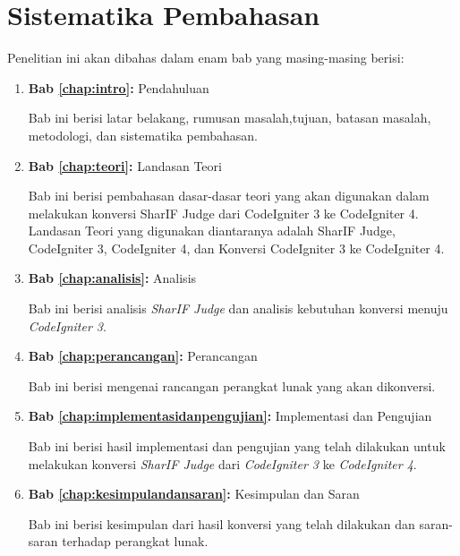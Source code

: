 \section{Sistematika Pembahasan}
\label{sec:sispem}
Penelitian ini akan dibahas dalam enam bab yang masing-masing berisi:
\begin{enumerate}
	\item \textbf{Bab \ref{chap:intro}:} Pendahuluan
	
	Bab ini berisi latar belakang, rumusan masalah,tujuan, batasan masalah, metodologi, dan sistematika pembahasan.
	\item \textbf{Bab \ref{chap:teori}:} Landasan Teori
	
	Bab ini berisi pembahasan dasar-dasar teori yang akan digunakan dalam melakukan konversi SharIF Judge dari CodeIgniter 3 ke CodeIgniter 4. Landasan Teori yang digunakan diantaranya adalah SharIF Judge, CodeIgniter 3, CodeIgniter 4, dan Konversi CodeIgniter 3 ke CodeIgniter 4.
	\item \textbf{Bab \ref{chap:analisis}:} Analisis
	
	Bab ini berisi analisis \textit{SharIF Judge} dan analisis kebutuhan konversi menuju \textit{CodeIgniter 3}.
	\item \textbf{Bab \ref{chap:perancangan}:} Perancangan
	
	Bab ini berisi mengenai rancangan perangkat lunak yang akan dikonversi.
	\item \textbf{Bab \ref{chap:implementasidanpengujian}:} Implementasi dan Pengujian
	
	Bab ini berisi hasil implementasi dan pengujian yang telah dilakukan untuk melakukan konversi \textit{SharIF Judge} dari \textit{CodeIgniter 3} ke \textit{CodeIgniter 4}.
	\item \textbf{Bab \ref{chap:kesimpulandansaran}:} Kesimpulan dan Saran
	
	Bab ini berisi kesimpulan dari hasil konversi yang telah dilakukan dan saran-saran terhadap perangkat lunak.
\end{enumerate}
